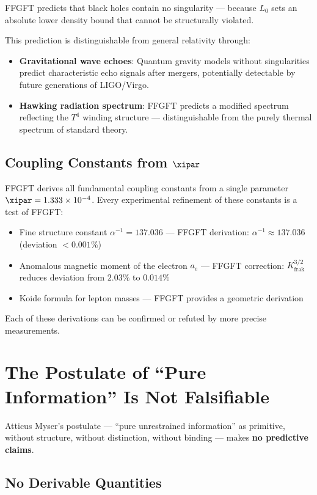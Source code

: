 FFGFT predicts that black holes contain no singularity --- because $L_0$ sets an absolute lower density bound that cannot be structurally violated.

This prediction is distinguishable from general relativity through:
\begin{itemize}
  \item \textbf{Gravitational wave echoes}: Quantum gravity models without singularities predict characteristic echo signals after mergers, potentially detectable by future generations of LIGO/Virgo.
  \item \textbf{Hawking radiation spectrum}: FFGFT predicts a modified spectrum reflecting the $T^4$ winding structure --- distinguishable from the purely thermal spectrum of standard theory.
\end{itemize}

\subsection{Coupling Constants from $\xipar$}

FFGFT derives all fundamental coupling constants from a single parameter $\xipar = 1.333 \times 10^{-4}$. Every experimental refinement of these constants is a test of FFGFT:
\begin{itemize}
  \item Fine structure constant $\alpha^{-1} = 137.036$ --- FFGFT derivation: $\alpha^{-1} \approx 137.036$ (deviation $< 0.001\%$)
  \item Anomalous magnetic moment of the electron $a_e$ --- FFGFT correction: $K_\text{frak}^{3/2}$ reduces deviation from $2.03\%$ to $0.014\%$
  \item Koide formula for lepton masses --- FFGFT provides a geometric derivation
\end{itemize}
Each of these derivations can be confirmed or refuted by more precise measurements.

\section{The Postulate of ``Pure Information'' Is Not Falsifiable}

Atticus Myser's postulate --- ``pure unrestrained information'' as primitive, without structure, without distinction, without binding --- makes \textbf{no predictive claims}.

\subsection{No Derivable Quantities}

